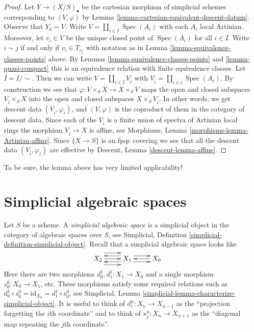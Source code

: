 \documentclass{stacks-project}
\theoremstyle{plain}
\theoremstyle{definition}
\theoremstyle{remark}
\numberwithin{equation}{subsection}
\def\Spec{\mathop{\mathrm{Spec}}}
\begin{document}
\begin{proof}
Let $Y \to (X/S)_\bullet$ be the cartesian morphism of simplicial
schemes corresponding to $(V, \varphi)$ by
Lemma \ref{lemma-cartesian-equivalent-descent-datum}.
Observe that $Y_0 = V$.
Write $V = \coprod_{i \in I} \Spec(A_i)$ with each $A_i$ local
Artinian. Moreover, let $v_i \in V$ be the unique closed point of
$\Spec(A_i)$ for all $i \in I$. Write $i \sim j$ if and only if
$v_i \in T_{v_j}$ with notation as in
Lemma \ref{lemma-equivalence-classes-points} above.
By Lemmas \ref{lemma-equivalence-classes-points} and \ref{lemma-quasi-compact}
this is an equivalence relation with finite equivalence
classes. Let $\overline{I} = I/\sim$. Then we can write
$V = \coprod_{\overline{i} \in \overline{I}} V_{\overline{i}}$
with
$V_{\overline{i}} = \coprod_{i \in \overline{i}} \Spec(A_i)$.
By construction we see that
$\varphi : V \times_S X \to X \times_S V$ maps
the open and closed subspaces $V_{\overline{i}} \times_S X$
into the open and closed subspaces $X \times_S V_{\overline{i}}$.
In other words, we get descent data
$(V_{\overline{i}}, \varphi_{\overline{i}})$, and
$(V, \varphi)$ is the coproduct of them in the category of
descent data.
Since each of the $V_{\overline{i}}$ is a finite union of
spectra of Artinian local rings the morphism $V_{\overline{i}} \to X$
is affine, see Morphisms, Lemma \ref{morphisms-lemma-Artinian-affine}.
Since $\{X \to S\}$ is an fpqc covering we see that all
the descent data $(V_{\overline{i}}, \varphi_{\overline{i}})$ are effective
by Descent, Lemma \ref{descent-lemma-affine}.
\end{proof}

\noindent
To be sure, the lemma above has very limited applicability!









\section{Simplicial algebraic spaces}
\label{section-simplicial-algebraic-spaces}

\noindent
Let $S$ be a scheme. A {\it simplicial algebraic space}
is a simplicial object in the category of algebraic spaces over $S$,
see Simplicial, Definition \ref{simplicial-definition-simplicial-object}.
Recall that a simplicial algebraic space looks like
$$
\xymatrix{
X_2
\ar@<2ex>[r]
\ar@<0ex>[r]
\ar@<-2ex>[r]
&
X_1
\ar@<1ex>[r]
\ar@<-1ex>[r]
\ar@<1ex>[l]
\ar@<-1ex>[l]
&
X_0
\ar@<0ex>[l]
}
$$
Here there are two morphisms $d^1_0, d^1_1 : X_1 \to X_0$
and a single morphism $s^0_0 : X_0 \to X_1$, etc.
These morphisms satisfy some required relations such as
$d^1_0 \circ s^0_0 = \text{id}_{X_0} = d^1_1 \circ s^0_0$, see
Simplicial, Lemma \ref{simplicial-lemma-characterize-simplicial-object}.
It is useful to think of $d^n_i : X_n \to X_{n - 1}$
as the ``projection forgetting the $i$th coordinate'' and
to think of $s^n_j : X_n \to X_{n + 1}$ as the ``diagonal map repeating
the $j$th coordinate''.
\end{document}
